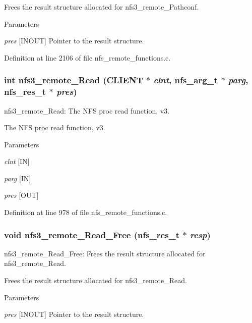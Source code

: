 Frees the result structure allocated for nfs3\_\-remote\_\-Pathconf.


\begin{DoxyParams}{Parameters}
\item[{\em pres}][INOUT] Pointer to the result structure. \end{DoxyParams}


Definition at line 2106 of file nfs\_\-remote\_\-functions.c.
\subsubsection[{nfs3\_\-remote\_\-Read}]{\setlength{\rightskip}{0pt plus 5cm}int nfs3\_\-remote\_\-Read (CLIENT $\ast$ {\em clnt}, \/  nfs\_\-arg\_\-t $\ast$ {\em parg}, \/  nfs\_\-res\_\-t $\ast$ {\em pres})}\label{group__NFSprocs_ga8de1a9ff512d9bc09985d1510b5ab7ab}
nfs3\_\-remote\_\-Read: The NFS proc read function, v3.

The NFS proc read function, v3.


\begin{DoxyParams}{Parameters}
\item[{\em clnt}][IN] \item[{\em parg}][IN] \item[{\em pres}][OUT] \end{DoxyParams}


Definition at line 978 of file nfs\_\-remote\_\-functions.c.
\subsubsection[{nfs3\_\-remote\_\-Read\_\-Free}]{\setlength{\rightskip}{0pt plus 5cm}void nfs3\_\-remote\_\-Read\_\-Free (nfs\_\-res\_\-t $\ast$ {\em resp})}\label{group__NFSprocs_ga5d054fdd8a7ec49bfd90085936faffb2}
nfs3\_\-remote\_\-Read\_\-Free: Frees the result structure allocated for nfs3\_\-remote\_\-Read.

Frees the result structure allocated for nfs3\_\-remote\_\-Read.


\begin{DoxyParams}{Parameters}
\item[{\em pres}][INOUT] Pointer to the result structure. \end{DoxyParams}


